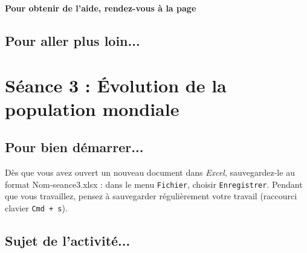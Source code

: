 \textbf{Pour obtenir de l'aide, rendez-vous à la page \pageref{aideExcel}}

\subsection{Pour aller plus loin...}


\newpage



%
%
%
%




\section{Séance 3 : Évolution de la population mondiale}\label{ficheTableur3}

\subsection{Pour bien démarrer...}

Dès que vous avez ouvert un nouveau document dans \emph{Excel}, sauvegardez-le au format Nom-seance3.xlsx : dans le menu \texttt{Fichier}, choisir \texttt{Enregistrer}. Pendant que vous travaillez, pensez à sauvegarder régulièrement votre travail (raccourci clavier \texttt{Cmd + s}).   


\subsection{Sujet de l'activité...}


